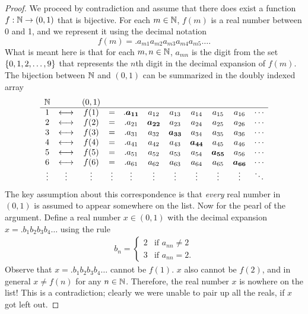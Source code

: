 \documentclass[11pt,twoside=off,numbers=noenddot]{scrbook}
\begin{document}
\begin{proof}
    We proceed by contradiction and assume that there does exist a function $f : \mathbb N \to (0, 1)$ that is bijective. For each $m \in \mathbb N$, $f(m)$ is a real number between 0 and 1, and we represent it using the decimal notation
    \[ f(m) = .a_{m1}a_{m2}a_{m3}a_{m4}a_{m5}\dots. \]
    What is meant here is that for each $m, n \in \mathbb N$, $a_{mn}$ is the digit from the set $\{ 0, 1, 2, \dots, 9 \}$ that represents the $n$th digit in the decimal expansion of $f(m)$. The bijection between $\mathbb N$ and $(0, 1)$ can be summarized in the doubly indexed array
    \begin{align*}
        \begin{array}{ccccccccccc}
            \mathbb N & & (0,1) & & & & & & & & \\
            \hline
            1 & \longleftrightarrow & f(1) & = & .\boldsymbol{a_{11}} & a_{12} & a_{13} & a_{14} & a_{15} & a_{16} & \cdots \\
            2 & \longleftrightarrow & f(2) & = & .a_{21} & \boldsymbol{a_{22}} & a_{23} & a_{24} & a_{25} & a_{26} & \cdots \\
            3 & \longleftrightarrow & f(3) & = & .a_{31} & a_{32} & \boldsymbol{a_{33}} & a_{34} & a_{35} & a_{36} & \cdots \\
            4 & \longleftrightarrow & f(4) & = & .a_{41} & a_{42} & a_{43} & \boldsymbol{a_{44}} & a_{45} & a_{46} & \cdots \\
            5 & \longleftrightarrow & f(5) & = & .a_{51} & a_{52} & a_{53} & a_{54} & \boldsymbol{a_{55}} & a_{56} & \cdots \\
            6 & \longleftrightarrow & f(6) & = & .a_{61} & a_{62} & a_{63} & a_{64} & a_{65} & \boldsymbol{a_{66}} & \cdots \\
            \vdots & \vdots & \vdots & \vdots & \vdots & \vdots & \vdots & \vdots & \vdots & \vdots & \ddots \\
        \end{array}
    \end{align*}
    The key assumption about this correspondence is that \textit{every} real number in $(0, 1)$ is assumed to appear somewhere on the list.
    Now for the pearl of the argument. Define a real number $x \in (0, 1)$ with the decimal expansion $x = .b_1b_2b_3b_4\dots$ using the rule
    \begin{align*}
        b_n = \begin{cases}
            2 & \text{if $a_{nn} \neq 2$} \\
            3 & \text{if $a_{nn} = 2$}.
        \end{cases}
    \end{align*}
    Observe that $x = .b_1b_2b_3b_4\dots$ cannot be $f(1)$. $x$ also cannot be $f(2)$, and in general $x \neq f(n)$ for any $n \in \mathbb N$. Therefore, the real number $x$ is nowhere on the list! This is a contradiction; clearly we were unable to pair up all the reals, if $x$ got left out.
\end{proof}
\end{document}
